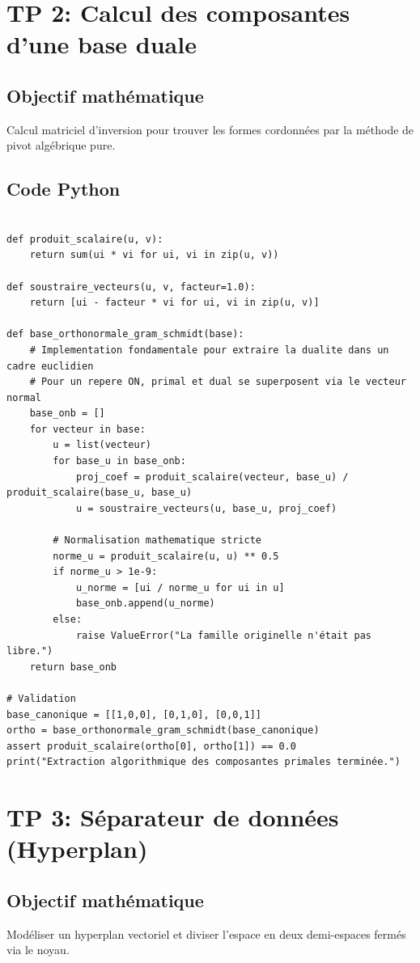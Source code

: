 \documentclass[11pt,a4paper]{report}
\begin{document}
\section{TP 2: Calcul des composantes d'une base duale}

\subsection{Objectif mathématique}
Calcul matriciel d'inversion pour trouver les formes cordonnées par la méthode de pivot algébrique pure.

\subsection{Code Python}
\begin{lstlisting}

def produit_scalaire(u, v):
    return sum(ui * vi for ui, vi in zip(u, v))

def soustraire_vecteurs(u, v, facteur=1.0):
    return [ui - facteur * vi for ui, vi in zip(u, v)]

def base_orthonormale_gram_schmidt(base):
    # Implementation fondamentale pour extraire la dualite dans un cadre euclidien
    # Pour un repere ON, primal et dual se superposent via le vecteur normal
    base_onb = []
    for vecteur in base:
        u = list(vecteur)
        for base_u in base_onb:
            proj_coef = produit_scalaire(vecteur, base_u) / produit_scalaire(base_u, base_u)
            u = soustraire_vecteurs(u, base_u, proj_coef)

        # Normalisation mathematique stricte
        norme_u = produit_scalaire(u, u) ** 0.5
        if norme_u > 1e-9:
            u_norme = [ui / norme_u for ui in u]
            base_onb.append(u_norme)
        else:
            raise ValueError("La famille originelle n'était pas libre.")
    return base_onb

# Validation
base_canonique = [[1,0,0], [0,1,0], [0,0,1]]
ortho = base_orthonormale_gram_schmidt(base_canonique)
assert produit_scalaire(ortho[0], ortho[1]) == 0.0
print("Extraction algorithmique des composantes primales terminée.")
\end{lstlisting}
\section{TP 3: Séparateur de données (Hyperplan)}

\subsection{Objectif mathématique}
Modéliser un hyperplan vectoriel et diviser l'espace en deux demi-espaces fermés via le noyau.
\end{document}
